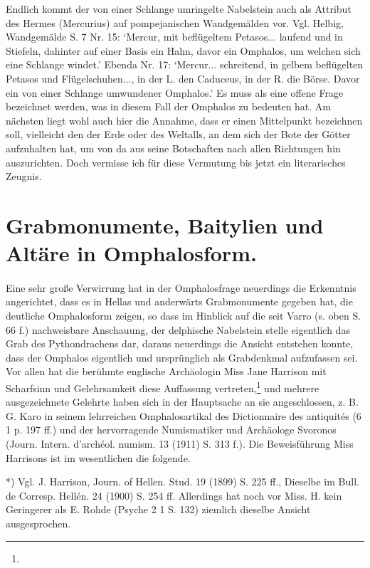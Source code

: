 \documentclass[a4paper, 11pt, oneside]{article}
\begin{document}
Endlich kommt der von einer Schlange umringelte Nabelstein auch als Attribut des Hermes (Mercurius) auf pompejanischen Wandgemälden vor. Vgl. Helbig, Wandgemälde S. 7 Nr. 15: `Mercur, mit beflügeltem Petasos... laufend und in Stiefeln, dahinter auf einer Basis ein Hahn, davor ein Omphalos, um welchen sich eine Schlange windet.' Ebenda Nr. 17: `Mercur... schreitend, in gelbem beflügelten Petasos und Flügelschuhen..., in der L. den Caduceus, in der R. die Börse. Davor ein von einer Schlange umwundener Omphalos.' Es muss als eine offene Frage bezeichnet werden, was in diesem Fall der Omphalos zu bedeuten hat. Am nächsten liegt wohl auch hier die Annahme, dass er einen Mittelpunkt bezeichnen soll, vielleicht den der Erde oder des Weltalls, an dem sich der Bote der Götter aufzuhalten hat, um von da aus seine Botschaften nach allen Richtungen hin auszurichten. Doch vermisse ich für diese Vermutung bis jetzt ein literarisches Zeugnis.
\clearpage
\section{Grabmonumente, Baitylien und Altäre in Omphalosform.}
\paragraph{}
Eine sehr große Verwirrung hat in der Omphalosfrage neuerdings die Erkenntnis angerichtet, dass es in Hellas und anderwärts Grabmonumente gegeben hat, die deutliche Omphalosform zeigen, so dass im Hinblick auf die seit Varro (s. oben S. 66 f.) nachweisbare Anschauung, der delphische Nabelstein stelle eigentlich das Grab des Pythondrachens dar, daraus neuerdings die Ansicht entstehen konnte, dass der Omphalos eigentlich und ursprünglich als Grabdenkmal aufzufassen sei. Vor allen hat die berühmte englische Archäologin Miss Jane Harrison mit Scharfsinn und Gelehrsamkeit diese Auffassung vertreten,\footnote{} und mehrere ausgezeichnete Gelehrte haben sich in der Hauptsache an sie angeschlossen, z. B. G. Karo in seinem lehrreichen Omphalosartikal des Dictionnaire des antiquités (6 1 p. 197 ff.) und der hervorragende Numismatiker und Archäologe Svoronos (Journ. Intern. d'archéol. numism. 13 (1911) S. 313 f.). Die Beweisführung Miss Harrisons ist im wesentlichen die folgende.

*) Vgl. J. Harrison, Journ. of Hellen. Stud. 19 (1899) S. 225 ff., Dieselbe im Bull. de Corresp. Hellén. 24 (1900) S. 254 ff. Allerdings hat noch vor Miss. H. kein Geringerer als E. Rohde (Psyche 2 1 S. 132) ziemlich dieselbe Ansicht ausgesprochen.
\end{document}
